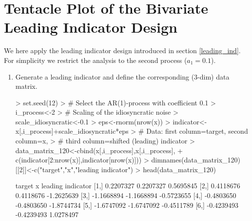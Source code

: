 \documentclass[a4paper]{book}
\begin{document}
\section{Tentacle Plot of the Bivariate Leading Indicator Design}\label{blid}

We here apply the leading indicator design introduced in section \ref{leading_ind}. For simplicity we restrict the analysis to the second process ($a_1=0.1$).
\begin{enumerate}
\item Generate a leading indicator and define the corresponding (3-dim) data matrix.
\begin{Schunk}
\begin{Sinput}
> set.seed(12)
> # Select the AR(1)-process with coefficient 0.1
> i_process<-2
> # Scaling of the idiosyncratic noise
> scale_idiosyncratic<-0.1
> eps<-rnorm(nrow(x))
> indicator<-x[,i_process]+scale_idiosyncratic*eps
> # Data: first column=target, second column=x, 
> #   third column=shifted (leading) indicator
> data_matrix_120<-cbind(x[,i_process],x[,i_process],
+                        c(indicator[2:nrow(x)],indicator[nrow(x)]))
> dimnames(data_matrix_120)[[2]]<-c("target","x","leading indicator")
> head(data_matrix_120)
\end{Sinput}
\begin{Soutput}
         target          x leading indicator
[1,]  0.2207327  0.2207327         0.5695845
[2,]  0.4118676  0.4118676        -1.2625639
[3,] -1.1668894 -1.1668894        -0.5723655
[4,] -0.4803650 -0.4803650        -1.8744734
[5,] -1.6747092 -1.6747092        -0.4511789
[6,] -0.4239493 -0.4239493         1.0278497
\end{Soutput}
\end{Schunk}


\end{enumerate}
\end{document}
